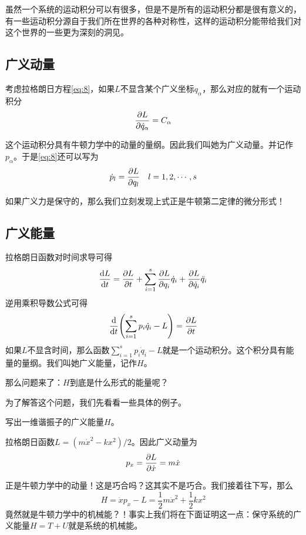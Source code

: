         虽然一个系统的运动积分可以有很多，但是不是所有的运动积分都是很有意义的，有一些运动积分源自于我们所在世界的各种对称性，这样的运动积分能带给我们对这个世界的一些更为深刻的洞见。

            \subsection{广义动量}
            考虑拉格朗日方程\ref{eq:8}，如果$L$不显含某个广义坐标$q_\alpha$，那么对应的就有一个运动积分
            \begin{equation}
                \label{广义动量}
                \pdv{L}{\dot{q}_\alpha}=C_\alpha
            \end{equation}

            这个运动积分具有牛顿力学中的动量的量纲。因此我们叫她为广义动量。并记作$p_\alpha$。于是\ref{eq:8}还可以写为
            \[
            \dot{p}_l=\pdv{L}{q_l} \quad l=1,2,\cdots,s
            \]

            如果广义力是保守的，那么我们立刻发现上式正是牛顿第二定律的微分形式！
            
            \subsection{广义能量}
            拉格朗日函数对时间求导可得
            \begin{equation}
                \label{eq:9}
                \dv{L}{t}=\pdv{L}{t}+\sum_{i=1}^{s}\pdv{L}{q_i}\dot{q}_i+\pdv{L}{\dot{q}_i}\ddot{q}_i
            \end{equation}
            逆用乘积导数公式可得
            \begin{equation}
                \label{eq:10}
                \dv{t}(\sum_{i=1}^{s}p_i\dot{q}_i - L) = \pdv{L}{t}
            \end{equation}
            如果$L$不显含时间，那么函数$\sum_{i=1}^{s}p_i\dot{q}_i - L$就是一个运动积分。这个积分具有能量的量纲。我们叫她广义能量，记作$H$。

            那么问题来了：$H$到底是什么形式的能量呢？

            为了解答这个问题，我们先看看一些具体的例子。

            \begin{example}
                写出一维谐振子的广义能量$H$。
            \end{example}
            \begin{solution}
                拉格朗日函数$L=(m\dot{x}^2-kx^2)/2$。因此广义动量为
                \[
                p_x=\pdv{L}{\dot{x}}=m\dot{x}
                \]
                
                正是牛顿力学中的动量！这是巧合吗？这其实不是巧合。我们接着往下写，那么
                \[
                H = \dot{x}p_x - L = \frac{1}{2}m\dot{x}^2 + \frac{1}{2}kx^2
                \]
                竟然就是牛顿力学中的机械能？！事实上我们将在下面证明这一点：保守系统的广义能量$H=T+U$就是系统的机械能。
            \end{solution}

